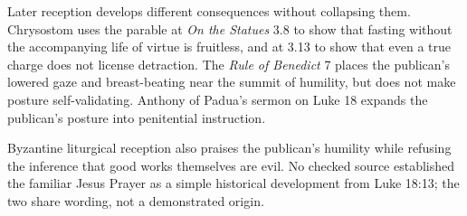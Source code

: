 {Later reception develops different consequences without collapsing them.
Chrysostom uses the parable at \emph{On the Statues} 3.8 to show that fasting
without the accompanying life of virtue is fruitless, and at 3.13 to show
that even a true charge does not license detraction. The \emph{Rule of
Benedict} 7 places the publican's lowered gaze and breast-beating near the
summit of humility, but does not make posture self-validating. Anthony of
Padua's sermon on Luke 18 expands the publican's posture into penitential
instruction.

Byzantine liturgical reception also praises the publican's humility while
refusing the inference that good works themselves are evil. No checked source established the familiar Jesus Prayer as
a simple historical development from Luke 18:13; the two share wording, not
a demonstrated origin.
}
